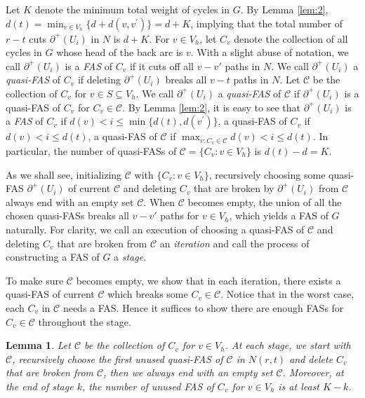 \documentclass[11pt]{article}
\newtheorem{lemma}[theorem]{Lemma}
\begin{document}
Let $K$ denote the minimum total weight of cycles in $G$. By Lemma \ref{lem:2}, $d(t)=\min_{v\in V_h}\{d+d(v,v^\prime)\}=d+K$, implying that the total number of $r-t$ cuts $\partial^+(U_i)$ in $N$ is $d+K$.
For $v\in V_h$, let $C_v$ denote the collection of all cycles in $G$ whose head of the back arc is $v$. With a slight abuse of notation, we call $\partial^+(U_i)$ is a \emph{FAS} of $C_v$ if it cuts off all $v-v'$ paths in $N$. We call $\partial^+(U_i)$ a \emph{quasi-FAS} of $C_v$ if deleting $\partial^+(U_i)$ breaks all $v-t$ paths in $N$. Let $\mathcal{C}$ be the collection of $C_v$ for $v\in S\subseteq V_h$. We call $\partial^+(U_i)$ a \emph{quasi-FAS} of $\mathcal{C}$ if $\partial^+(U_i)$ is a quasi-FAS of $C_v$ for $C_v\in\mathcal{C}$. By Lemma \ref{lem:2}, it is easy to see that $\partial^+(U_i)$ is a \emph{FAS} of $C_v$ if $d(v)<i\leq \min\{d(t),d(v^\prime)\}$, a quasi-FAS of $C_v$ if $d(v) <i\leq d(t)$, a quasi-FAS of $\mathcal{C}$ if $\max_{v:C_v\in \mathcal{C}}d(v)<i\leq d(t)$. In particular, the number of quasi-FASs of $\mathcal{C}=\{C_v: v\in V_h\}$ is $d(t)-d=K$.

 As we shall see, initializing $\mathcal{C}$ with $\{C_v: v\in V_h\}$, recursively choosing some quasi-FAS $\partial^+(U_i)$ of current $\mathcal{C}$ and deleting $C_v$ that are broken by $\partial^+(U_i)$ from $\mathcal{C}$ always end with an empty set $\mathcal{C}$.
 When $\mathcal{C}$ becomes empty, the union of all the chosen quasi-FASs breaks all $v-v'$ paths for $v\in V_h$, which yields a FAS of $G$ naturally.
 For clarity, we call an execution of choosing a quasi-FAS of $\mathcal{C}$ and deleting $C_v$ that are broken from $\mathcal{C}$ an \emph{iteration} and call the process of constructing a FAS of $G$ a \emph{stage}.

To make sure $\mathcal{C}$ becomes empty, we show that in each iteration, there exists a quasi-FAS of current $\mathcal{C}$ which breaks some $C_v\in\mathcal{C}$. Notice that in the worst case, each $C_v$ in $\mathcal{C}$ needs a FAS. Hence it suffices to show there are enough FASs for $C_v\in\mathcal{C}$ throughout the stage.

\begin{lemma} 
\label{lem:3}
Let $\mathcal{C}$ be the collection of $C_v$ for $v\in V_h$. At each stage, we start with $\mathcal{C}$, recursively choose the first unused quasi-FAS of $\mathcal{C}$ in $N(r,t)$ and delete $C_v$ that are broken from $\mathcal{C}$, then we always end with an empty set $\mathcal{C}$. Moreover, at the end of stage $k$, the number of unused FAS of $C_v$ for $v\in V_h$ is at least $K-k$.
\end{lemma}
\end{document}
